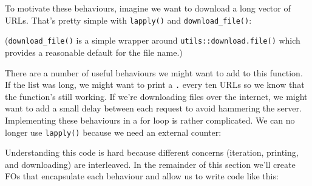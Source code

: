 To motivate these behaviours, imagine we want to download a long vector
of URLs. That's pretty simple with \texttt{lapply()} and
\texttt{download\_file()}:

\begin{Shaded}
\begin{Highlighting}[]
\StringTok{ }
\NormalTok{\}}
\end{Highlighting}
\end{Shaded}

(\texttt{download\_file()} is a simple wrapper around
\texttt{utils::download.file()} which provides a reasonable default for
the file name.)

There are a number of useful behaviours we might want to add to this
function. If the list was long, we might want to print a \texttt{.}
every ten URLs so we know that the function's still working. If we're
downloading files over the internet, we might want to add a small delay
between each request to avoid hammering the server. Implementing these
behaviours in a for loop is rather complicated. We can no longer use
\texttt{lapply()} because we need an external counter:

\begin{Shaded}
\end{Shaded}

Understanding this code is hard because different concerns (iteration,
printing, and downloading) are interleaved. In the remainder of this
section we'll create FOs that encapsulate each behaviour and allow us to
write code like this:

\begin{Shaded}
\begin{Highlighting}[]
\NormalTok{(}\NormalTok{, }\NormalTok{(}
\end{Highlighting}
\end{Shaded}

